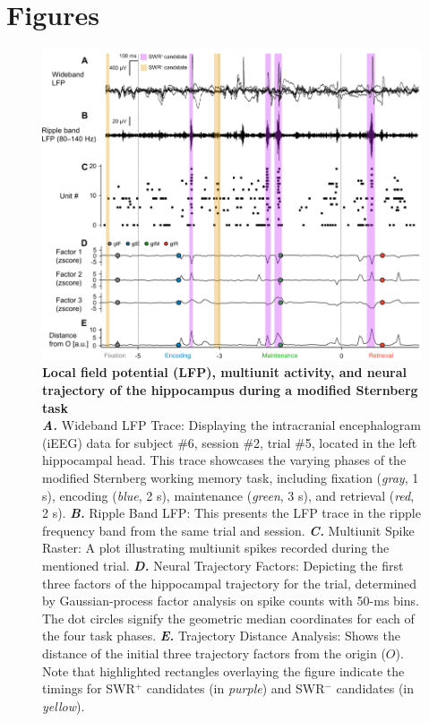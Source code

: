 \documentclass[final,3p,times,twocolumn]{elsarticle}
\begin{document}
\clearpage
\section*{Figures}
\label{figures}
        \clearpage
        \begin{figure}[ht]
        	\centering
            \includegraphics[width=1\textwidth]{./media/figures/.png/Figure_ID_01.png}
        	\caption{\textbf{
Local field potential (LFP), multiunit activity, and neural trajectory of the hippocampus during a modified Sternberg task
}
\smallskip
\\
\textbf{\textit{A.}} Wideband LFP Trace: Displaying the intracranial encephalogram (iEEG) data for subject \#6, session \#2, trial \#5, located in the left hippocampal head. This trace showcases the varying phases of the modified Sternberg working memory task, including fixation (\textit{gray}, 1 s), encoding (\textit{blue}, 2 s), maintenance (\textit{green}, 3 s), and retrieval (\textit{red}, 2 s). \textbf{\textit{B.}} Ripple Band LFP: This presents the LFP trace in the ripple frequency band from the same trial and session. \textbf{\textit{C.}} Multiunit Spike Raster: A plot illustrating multiunit spikes recorded during the mentioned trial. \textbf{\textit{D.}} Neural Trajectory Factors: Depicting the first three factors of the hippocampal trajectory for the trial, determined by Gaussian-process factor analysis on spike counts with 50-ms bins. The dot circles signify the geometric median coordinates for each of the four task phases. \textbf{\textit{E.}} Trajectory Distance Analysis: Shows the distance of the initial three trajectory factors from the origin ($O$). Note that highlighted rectangles overlaying the figure indicate the timings for SWR$^+$ candidates (in \textit{purple}) and SWR$^-$ candidates (in \textit{yellow}).
}
        	\label{fig:01}
        \end{figure}
\end{document}
